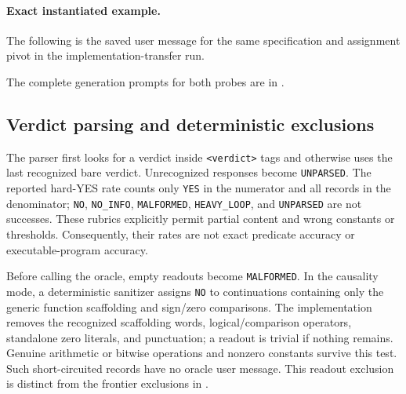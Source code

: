 \paragraph{Exact instantiated example.}
The following is the saved user message for the same specification and assignment pivot in the implementation-transfer run.

The complete generation prompts for both probes are in .

\subsection{Verdict parsing and deterministic exclusions}
The parser first looks for a verdict inside \texttt{<verdict>} tags and otherwise uses the last recognized bare verdict. Unrecognized responses become \texttt{UNPARSED}. The reported hard-YES rate counts only \texttt{YES} in the numerator and all records in the denominator; \texttt{NO}, \texttt{NO\_INFO}, \texttt{MALFORMED}, \texttt{HEAVY\_LOOP}, and \texttt{UNPARSED} are not successes. These rubrics explicitly permit partial content and wrong constants or thresholds. Consequently, their rates are not exact predicate accuracy or executable-program accuracy.

Before calling the oracle, empty readouts become \texttt{MALFORMED}. In the causality mode, a deterministic sanitizer assigns \texttt{NO} to continuations containing only the generic function scaffolding and sign/zero comparisons. The implementation removes the recognized scaffolding words, logical/comparison operators, standalone zero literals, and punctuation; a readout is trivial if nothing remains. Genuine arithmetic or bitwise operations and nonzero constants survive this test. Such short-circuited records have no oracle user message. This readout exclusion is distinct from the frontier exclusions in .
